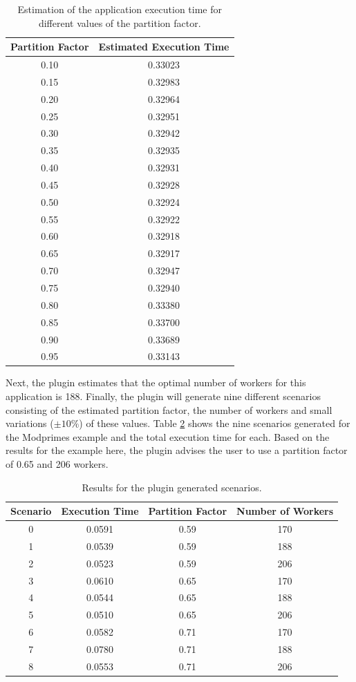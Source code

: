 \begin{table}
    \centering
    \begin{tabular}{|c | c|}
    \hline
 {Partition Factor} &{Estimated Execution Time}\\\hline\hline
 0.10 & 0.33023\\
0.15 & 0.32983\\
0.20 & 0.32964\\
0.25 & 0.32951\\
0.30 & 0.32942\\
0.35 & 0.32935\\
0.40 & 0.32931\\
0.45 & 0.32928\\
0.50 & 0.32924\\
0.55 & 0.32922\\
0.60 & 0.32918\\
0.65 & 0.32917\\
0.70 & 0.32947\\
0.75 & 0.32940\\
0.80 & 0.33380\\
0.85 & 0.33700\\
0.90 & 0.33689\\
0.95 & 0.33143\\\hline
    \end{tabular}
    \caption{Estimation of the application execution time for different values of the partition factor.}
\label{tab:mw-pf-estimation}
\end{table}

Next, the plugin estimates that the optimal number of workers for this application is 188. Finally, the plugin will generate nine different scenarios consisting of the estimated partition factor, the number of workers and small variations ($\pm10\%$) of these values. Table \ref{tab:mw-plug-res} shows the nine scenarios generated for the Modprimes example and the total execution time for each. Based on the results for the example here, the plugin advises the user to use a partition factor of 0.65 and 206 workers.

\begin{table}
    \centering
    \begin{tabular}{|c | c| c| c|}
    \hline
 {Scenario} &{Execution Time}& {Partition Factor} & {Number of Workers} \\\hline\hline
0  &  0.0591 & 0.59     & 170\\
1   & 0.0539 & 0.59    & 188\\
2  &  0.0523 & 0.59  & 206\\
3  & 0.0610 & 0.65  & 170\\
4  & 0.0544 & 0.65 & 188\\
5  &  0.0510 & 0.65 & 206\\
6  &  0.0582 & 0.71 & 170\\
7  & 0.0780 & 0.71 & 188\\
8  &  0.0553 & 0.71 & 206\\\hline
    \end{tabular}
    \caption{Results for the plugin generated scenarios.}
\label{tab:mw-plug-res}
\end{table}

